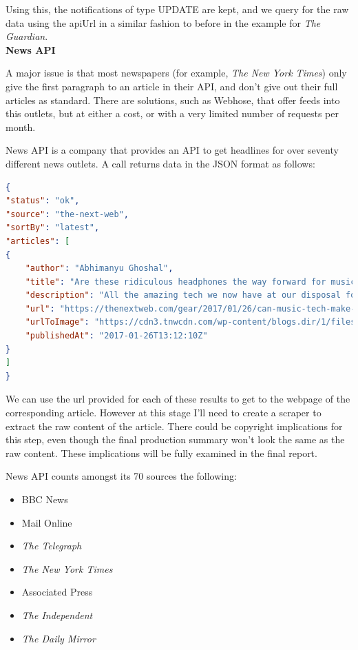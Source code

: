 \documentclass[12pt]{article}
\begin{document}
Using this, the notifications of type UPDATE are kept, and we query for the raw data using the apiUrl in a similar fashion to before in the example for \emph{The Guardian}. \\

\textbf{News API}

A major issue is that most newspapers (for example, \emph{The New York Times}\cite{newYorkTimes}) only give the first paragraph to an article in their API, and don't give out their full articles as standard. There are solutions, such as Webhose\cite{webhose}, that offer feeds into this outlets, but at either a cost, or with a very limited number of requests per month. 

News API\cite{newsApi} is a company that provides an API to get headlines for over seventy different news outlets. A call returns data in the JSON format as follows:

\begin{lstlisting}[language=json, firstnumber=1]
{
"status": "ok",
"source": "the-next-web",
"sortBy": "latest",
"articles": [
{
	"author": "Abhimanyu Ghoshal",
	"title": "Are these ridiculous headphones the way forward for music tech?",
	"description": "All the amazing tech we now have at our disposal for enjoying music is closing us off from other people instead of bringing us together. Is there hope yet?",
	"url": "https://thenextweb.com/gear/2017/01/26/can-music-tech-make-us-sociable-again/",
	"urlToImage": "https://cdn3.tnwcdn.com/wp-content/blogs.dir/1/files/2017/01/Vinci-hed-1.jpg",
	"publishedAt": "2017-01-26T13:12:10Z"
}
]
}
\end{lstlisting}

We can use the url provided for each of these results to get to the webpage of the corresponding article. However at this stage I'll need to create a scraper to extract the raw content of the article. There could be copyright implications for this step, even though the final production summary won't look the same as the raw content. These implications will be fully examined in the final report.

News API counts amongst its 70 sources the following: \\

\begin{itemize}
	\item BBC News 
	\item Mail Online 
	\item \emph{The Telegraph} 
	\item \emph{The New York Times} 
	\item Associated Press 
	\item \emph{The Independent} 
	\item \emph{The Daily Mirror}  \\
\end{itemize}
\end{document}
